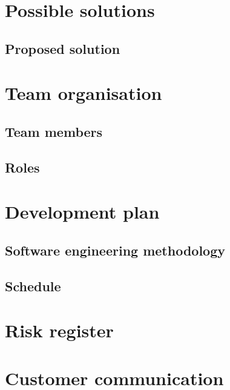 \documentclass[10pt,a4paper]{article}
\begin{document}
\section{Possible solutions}

\subsection{Proposed solution}


\section{Team organisation}

\subsection{Team members}

\subsection{Roles}


\section{Development plan}

\subsection{Software engineering methodology}

\subsection{Schedule}


\section{Risk register}


\section{Customer communication}
\end{document}
